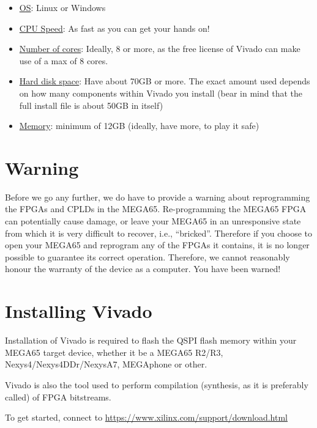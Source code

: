 \begin{itemize}
  \item \underline{OS}: Linux or Windows
  \item \underline{CPU Speed}: As fast as you can get your hands on!
  \item \underline{Number of cores}: Ideally, 8 or more, as the free license of Vivado can make use of a max of 8 cores.
  \item \underline{Hard disk space}: Have about 70GB or more. The exact amount used depends on how many components within Vivado you install (bear in mind that the full install file is about 50GB in itself)
  \item \underline{Memory}: minimum of 12GB (ideally, have more, to play it safe)
\end{itemize}

\section{Warning}

Before we go any further, we do have to provide a warning about reprogramming the FPGAs and
CPLDs in the MEGA65.
Re-programming the MEGA65 FPGA can potentially cause
damage, or leave your MEGA65 in an unresponsive state from which it is very difficult to
recover, i.e., ``bricked''.  Therefore if you choose to open your MEGA65 and reprogram
any of the FPGAs it contains, it is no longer possible to guarantee its correct operation.
Therefore, we cannot reasonably honour the warranty of the
device as a computer.
You have been warned!

\section{Installing Vivado}
\label{sec:installvivado}

Installation of Vivado is required to flash the QSPI flash memory within your MEGA65 target device, whether it be a MEGA65 R2/R3, Nexys4/Nexys4DDr/NexysA7, MEGAphone or other.

Vivado is also the tool used to perform compilation (synthesis, as it is preferably called) of FPGA bitstreams.

To get started, connect to \url{https://www.xilinx.com/support/download.html}

